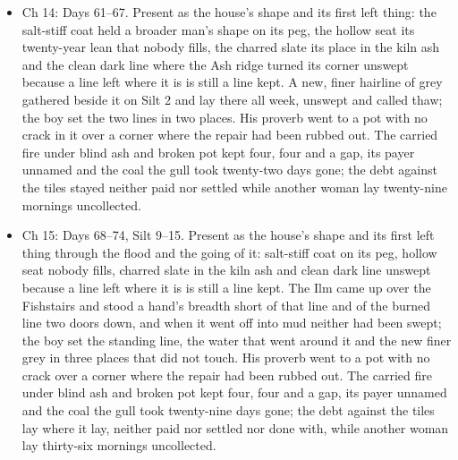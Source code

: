 \documentclass{design/chronicle}
\begin{document}
{\begin{itemize}[leftmargin=1.4em,itemsep=1pt,topsep=3pt,parsep=0pt]

\item Ch 14: Days 61–67. Present as the house’s shape and its first left thing: the salt-stiff coat held a broader man’s shape on its peg, the hollow seat its twenty-year lean that nobody fills, the charred slate its place in the kiln ash and the clean dark line where the Ash ridge turned its corner unswept because a line left where it is is still a line kept. A new, finer hairline of grey gathered beside it on Silt 2 and lay there all week, unswept and called thaw; the boy set the two lines in two places. His proverb went to a pot with no crack in it over a corner where the repair had been rubbed out. The carried fire under blind ash and broken pot kept four, four and a gap, its payer unnamed and the coal the gull took twenty-two days gone; the debt against the tiles stayed neither paid nor settled while another woman lay twenty-nine mornings uncollected.

\end{itemize}

\begin{itemize}[leftmargin=1.4em,itemsep=1pt,topsep=3pt,parsep=0pt]

\item Ch 15: Days 68–74, Silt 9–15. Present as the house’s shape and its first left thing through the flood and the going of it: salt-stiff coat on its peg, hollow seat nobody fills, charred slate in the kiln ash and clean dark line unswept because a line left where it is is still a line kept. The Ilm came up over the Fishstairs and stood a hand’s breadth short of that line and of the burned line two doors down, and when it went off into mud neither had been swept; the boy set the standing line, the water that went around it and the new finer grey in three places that did not touch. His proverb went to a pot with no crack over a corner where the repair had been rubbed out. The carried fire under blind ash and broken pot kept four, four and a gap, its payer unnamed and the coal the gull took twenty-nine days gone; the debt against the tiles lay where it lay, neither paid nor settled nor done with, while another woman lay thirty-six mornings uncollected.

\end{itemize}
}
\end{document}
